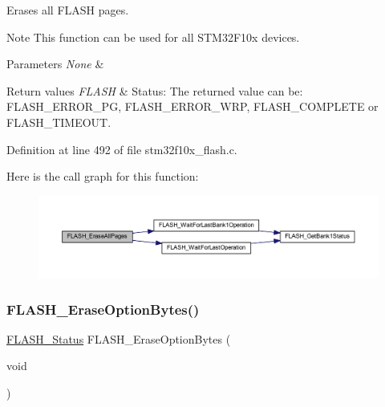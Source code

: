 Erases all F\+L\+A\+SH pages. 

\begin{DoxyNote}{Note}
This function can be used for all S\+T\+M32\+F10x devices. 
\end{DoxyNote}

\begin{DoxyParams}{Parameters}
{\em None} & \\
\hline
\end{DoxyParams}

\begin{DoxyRetVals}{Return values}
{\em F\+L\+A\+SH} & Status\+: The returned value can be\+: F\+L\+A\+S\+H\+\_\+\+E\+R\+R\+O\+R\+\_\+\+PG, F\+L\+A\+S\+H\+\_\+\+E\+R\+R\+O\+R\+\_\+\+W\+RP, F\+L\+A\+S\+H\+\_\+\+C\+O\+M\+P\+L\+E\+TE or F\+L\+A\+S\+H\+\_\+\+T\+I\+M\+E\+O\+UT. \\
\hline
\end{DoxyRetVals}


Definition at line 492 of file stm32f10x\+\_\+flash.\+c.

Here is the call graph for this function\+:
\nopagebreak
\begin{figure}[H]
\begin{center}
\leavevmode
\includegraphics[width=350pt]{group___f_l_a_s_h___private___functions_gab2e6dea62c72b3e47c17512579d37498_cgraph}
\end{center}
\end{figure}
\mbox{\label{group___f_l_a_s_h___private___functions_ga152768609e85d74a9d8474be8dc2874b}} 
\subsubsection{\texorpdfstring{F\+L\+A\+S\+H\+\_\+\+Erase\+Option\+Bytes()}{FLASH\_EraseOptionBytes()}}
{\footnotesize\ttfamily \hyperlink{group___f_l_a_s_h___exported___types_gadc63a6f3404ff1f71229a66915e9cdc0}{F\+L\+A\+S\+H\+\_\+\+Status} F\+L\+A\+S\+H\+\_\+\+Erase\+Option\+Bytes (\begin{DoxyParamCaption}\item[{void}]{ }\end{DoxyParamCaption})}



